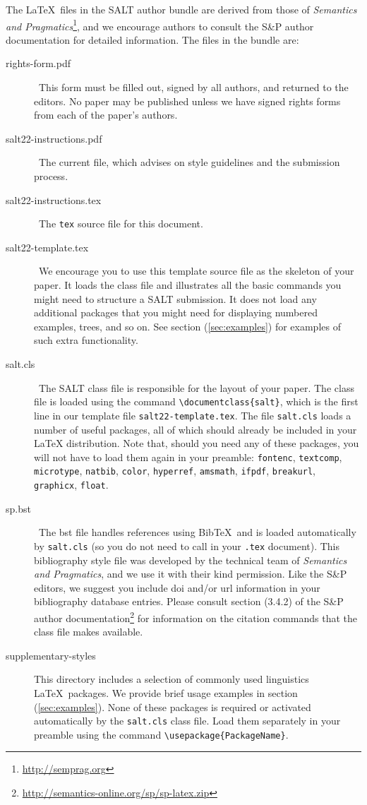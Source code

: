 \documentclass{salt}
\newcommand{\BibTeX}{{\sc Bib}\TeX }
\begin{document}
The \LaTeX\ files in the SALT author bundle are derived from those of \emph{Semantics and Pragmatics}\footnote{\url{http://semprag.org}}, and we encourage authors to consult the S\&P author documentation for detailed information. The files in the bundle are:

\begin{description}
  \item[rights-form.pdf] \ This form must be filled out, signed by all authors, and returned to the editors.  No paper may be published unless we have signed rights forms from each of the paper's authors.
  \item[salt22-instructions.pdf]\  The current file, which advises on style guidelines and the submission process.
  \item[salt22-instructions.tex]\  The \verb+tex+ source file for this document.
  \item[salt22-template.tex]\  We encourage you to use this template source file as the skeleton of your paper. It loads the class file and illustrates all the basic commands you might need to structure a SALT submission. It does not load any additional packages that you might need for displaying numbered examples, trees, and so on. See section (\ref{sec:examples}) for examples of such extra functionality.
  \item[salt.cls] \ The SALT class file is responsible for the layout of your paper. The class file is loaded using the command \verb+\documentclass{salt}+, which is the first line in our template file \verb+salt22-template.tex+. The file \verb+salt.cls+ loads a number of useful packages, all of which should already be included in your \LaTeX{} distribution. Note that, should you need any of these packages, you will not have to load them again in your preamble: \verb+fontenc+, \verb+textcomp+, \verb+microtype+, \verb+natbib+, \verb+color+, \verb+hyperref+, \verb+amsmath+, \verb+ifpdf+, \verb+breakurl+, \verb+graphicx+, \verb+float+.
  \item[sp.bst]\ The bst file handles references using \BibTeX\ and is loaded automatically by \verb+salt.cls+ (so you do not need to call \verb++ in your \verb+.tex+ document). This bibliography style file was developed by the technical team of \emph{Semantics and Pragmatics}, and we use it with their kind permission. Like the S\&P editors, we suggest you include doi and/or url information in your bibliography database entries.  Please consult section (3.4.2) of the S\&P author documentation\footnote{\url{http://semantics-online.org/sp/sp-latex.zip}} for information on the citation commands that the class file makes available.
   \item[supplementary-styles] This directory includes a selection of commonly used linguistics \LaTeX\ packages. We provide brief usage examples in section (\ref{sec:examples}). None of these packages is required or activated automatically by the \verb+salt.cls+ class file. Load them separately in your preamble using the command \verb+\usepackage{PackageName}+.\end{description}
   
\end{document}
